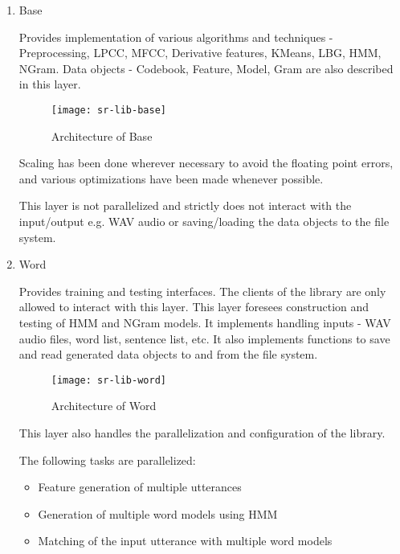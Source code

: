 \begin{enumerate}

\item Base

Provides implementation of various algorithms and techniques - Preprocessing, LPCC, MFCC, Derivative features, KMeans, LBG, HMM, NGram. Data objects - Codebook, Feature, Model, Gram are also described in this layer.

\begin{figure}[h!]
    \centering
    \texttt{[image: sr-lib-base]}
    \label{fig:sr-lib-base}
    \caption{Architecture of Base}
\end{figure}

Scaling has been done wherever necessary to avoid the floating point errors, and various optimizations have been made whenever possible. 

This layer is not parallelized and strictly does not interact with the input/output e.g. WAV audio or saving/loading the data objects to the file system.

\item Word

Provides training and testing interfaces. The clients of the library are only allowed to interact with this layer.
This layer foresees construction and testing of HMM and NGram models. It implements handling inputs - WAV audio files, word list, sentence list, etc. It also implements functions to save and read generated data objects to and from the file system.

\begin{figure}[h!]
    \centering
    \texttt{[image: sr-lib-word]}
    \label{fig:sr-lib-word}
    \caption{Architecture of Word}
\end{figure}

This layer also handles the parallelization and configuration of the library.

The following tasks are parallelized:
\begin{itemize}
    \item Feature generation of multiple utterances
    \item Generation of multiple word models using HMM
    \item Matching of the input utterance with multiple word models
\end{itemize}


\end{enumerate}
